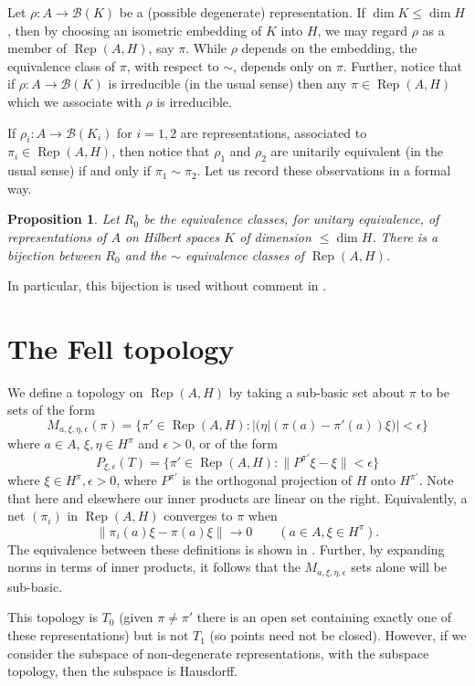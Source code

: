 \documentclass[a4paper,11pt]{article}
\newcommand{\mc}[1]{{\mathcal{#1}}}
\newcommand{\Rep}{\operatorname{Rep}}
\newtheorem{proposition}[lemma]{Proposition}
\begin{document}
Let $\rho:A\rightarrow\mc B(K)$ be a (possible degenerate) representation.
If $\dim K \leq \dim H$, then by choosing an isometric embedding of $K$ into
$H$, we may regard $\rho$ as a member of $\Rep(A,H)$, say $\pi$.  While $\rho$ depends on the embedding, the equivalence class of $\pi$, with respect to
$\sim$, depends only on $\pi$.
Further, notice that if $\rho:A\rightarrow\mc B(K)$ is irreducible (in the
usual sense) then any $\pi\in\Rep(A,H)$ which we associate with $\rho$ is
irreducible.

If $\rho_i:A\rightarrow\mc B(K_i)$ for $i=1,2$ are representations,
associated to $\pi_i\in\Rep(A,H)$, then notice that $\rho_1$ and $\rho_2$
are unitarily equivalent (in the usual sense) if and only if $\pi_1\sim\pi_2$.
Let us record these observations in a formal way.

\begin{proposition}\label{prop:eq_classes}
Let $R_0$ be the equivalence classes, for unitary equivalence, of
representations of $A$ on Hilbert spaces $K$ of dimension $\leq\dim H$.
There is a bijection between $R_0$ and the $\sim$ equivalence classes of
$\Rep(A,H)$.
\end{proposition}

In particular, this bijection is used without comment in
\cite[Section~2]{fell2}.


\section{The Fell topology}

We define a topology on $\Rep(A,H)$ by taking a sub-basic set about $\pi$
to be sets of the form
\[ M_{a,\xi,\eta,\epsilon}(\pi) =
\big\{ \pi'\in\Rep(A,H) : |(\eta|(\pi(a)-\pi'(a))\xi)|<\epsilon \big\} \]
where $a\in A$, $\xi,\eta\in H^\pi$ and $\epsilon>0$, or of the form
\[ P_{\xi,\epsilon}(T) = \{ \pi'\in\Rep(A,H) : \|P^{\pi'}\xi - \xi\|
< \epsilon \} \]
where $\xi\in H^\pi, \epsilon>0$, where $P^{\pi'}$ is the orthogonal
projection of $H$ onto $H^{\pi'}$.  Note that here
and elsewhere our inner products are linear on the right.
Equivalently, a net $(\pi_i)$ in $\Rep(A,H)$ converges to $\pi$ when
\[ \|\pi_i(a)\xi - \pi(a)\xi\| \rightarrow 0 \qquad (a\in A,\xi\in H^\pi). \]
The equivalence between these definitions is shown in \cite[page~239]{fell2}.
Further, by expanding norms in terms of inner products, it follows that
the $M_{a,\xi,\eta,\epsilon}$ sets alone will be sub-basic.

This topology is $T_0$ (given
$\pi\not=\pi'$ there is an open set containing exactly one of these
representations) but is not $T_1$ (so points need not be closed).  However,
if we consider the subspace of non-degenerate representations, with the
subspace topology, then the subspace is Hausdorff.
\end{document}
